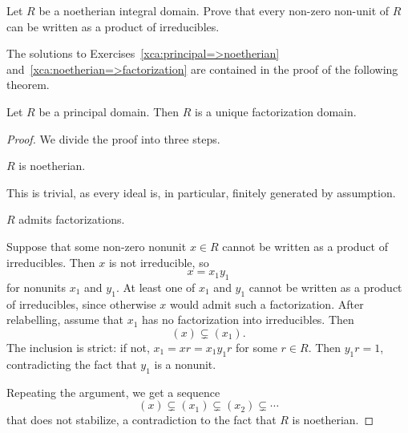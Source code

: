 \begin{exercise}
\label{xca:noetherian=>factorization}
  Let $R$ be a noetherian integral domain. Prove that
  every non-zero non-unit of $R$
  can be written as a product of irreducibles.
\end{exercise}

The solutions to Exercises~\ref{xca:principal=>noetherian}
and~\ref{xca:noetherian=>factorization} are contained in the proof of the
following theorem. 

\begin{theorem}
\label{thm:PID=>UFD}
	Let $R$ be a principal domain. 
	Then $R$ is a unique factorization domain.
\end{theorem}

\begin{proof}
	We divide the proof into three steps. 
	\begin{claim}
		$R$ is noetherian. 	
	\end{claim}
	
  This is trivial, as every ideal is, in particular, finitely generated by
  assumption.   

	\begin{claim}
		$R$ admits factorizations. 	
	\end{claim}

Suppose that some non-zero nonunit
$x\in R$ cannot be written as a product of irreducibles.
Then $x$ is not irreducible, so
\[
x=x_1y_1
\]
for nonunits $x_1$ and $y_1$. At least one of $x_1$ and $y_1$ cannot
be written as a product of irreducibles, since otherwise $x$
would admit such a factorization. After relabelling, assume that
$x_1$ has no factorization into irreducibles.
Then 
\[
(x)\subsetneq(x_1).
\]
The inclusion is strict: if not,  $x_1=xr=x_1y_1r$ for some $r\in R$. Then 
$y_1r=1$, contradicting the fact that $y_1$ is a nonunit.

Repeating the argument, we get a sequence 
\[
(x)\subsetneq(x_1)\subsetneq(x_2)\subsetneq\cdots
\]
that does not stabilize, a contradiction to the fact that $R$ is noetherian.
	
	

\end{proof}
